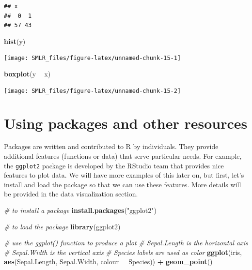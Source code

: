 \documentclass[
]{book}
\newenvironment{Shaded}{\begin{snugshade}}{\end{snugshade}}
\newcommand{\CommentTok}[1]{\textcolor[rgb]{0.56,0.35,0.01}{\textit{#1}}}
\newcommand{\DataTypeTok}[1]{\textcolor[rgb]{0.13,0.29,0.53}{#1}}
\newcommand{\KeywordTok}[1]{\textcolor[rgb]{0.13,0.29,0.53}{\textbf{#1}}}
\newcommand{\NormalTok}[1]{#1}
\newcommand{\OperatorTok}[1]{\textcolor[rgb]{0.81,0.36,0.00}{\textbf{#1}}}
\newcommand{\StringTok}[1]{\textcolor[rgb]{0.31,0.60,0.02}{#1}}
\begin{document}
\begin{verbatim}
## x
##  0  1 
## 57 43
\end{verbatim}

\begin{Shaded}
\begin{Highlighting}[]
  \KeywordTok{hist}\NormalTok{(y)}
\end{Highlighting}
\end{Shaded}

\begin{center}\texttt{[image: SMLR\_files/figure-latex/unnamed-chunk-15-1]} \end{center}

\begin{Shaded}
\begin{Highlighting}[]
  \KeywordTok{boxplot}\NormalTok{(y }\OperatorTok{~}\StringTok{ }\NormalTok{x)}
\end{Highlighting}
\end{Shaded}

\begin{center}\texttt{[image: SMLR\_files/figure-latex/unnamed-chunk-15-2]} \end{center}

\hypertarget{using-packages-and-other-resources}{%
\section{Using packages and other resources}\label{using-packages-and-other-resources}}

Packages are written and contributed to R by individuals. They provide additional features (functions or data) that serve particular needs. For example, the \texttt{ggplot2} package is developed by the RStudio team that provides nice features to plot data. We will have more examples of this later on, but first, let's install and load the package so that we can use these features. More details will be provided in the data visualization section.

\begin{Shaded}
\begin{Highlighting}[]
  \CommentTok{# to install a package}
  \KeywordTok{install.packages}\NormalTok{(}\StringTok{"ggplot2"}\NormalTok{)}
\end{Highlighting}
\end{Shaded}

\begin{Shaded}
\begin{Highlighting}[]
  \CommentTok{# to load the package}
  \KeywordTok{library}\NormalTok{(ggplot2)}

  \CommentTok{# use the ggplot() function to produce a plot}
  \CommentTok{# Sepal.Length is the horizontal axis}
  \CommentTok{# Sepal.Width is the vertical axis}
  \CommentTok{# Species labels are used as color}
  \KeywordTok{ggplot}\NormalTok{(iris, }\KeywordTok{aes}\NormalTok{(Sepal.Length, Sepal.Width, }\DataTypeTok{colour =}\NormalTok{ Species)) }\OperatorTok{+}\StringTok{ }
\StringTok{    }\KeywordTok{geom_point}\NormalTok{()  }
\end{Highlighting}
\end{Shaded}
\end{document}
